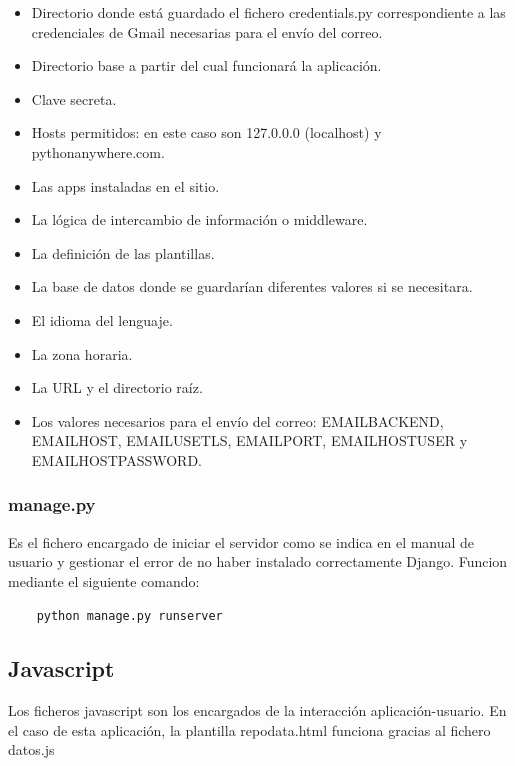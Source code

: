 \documentclass[a4paper, 12pt]{book}
\begin{document}
\begin{itemize}
	\item Directorio donde está guardado el fichero credentials.py correspondiente a las credenciales de Gmail necesarias para el envío del correo.
	\item Directorio base a partir del cual funcionará la aplicación.
	\item Clave secreta.
	\item Hosts permitidos: en este caso son 127.0.0.0 (localhost) y pythonanywhere.com.
	\item Las apps instaladas en el sitio.
	\item La lógica de intercambio de información o middleware\cite{website:middleware}.
	\item La definición de las plantillas.
	\item La base de datos donde se guardarían diferentes valores si se necesitara.
	\item El idioma del lenguaje.
	\item La zona horaria.
	\item La URL y el directorio raíz.
	\item Los valores necesarios para el envío del correo: EMAIL\textunderscore BACKEND, EMAIL\textunderscore HOST, EMAIL\textunderscore USE\textunderscore TLS, EMAIL\textunderscore PORT, EMAIL\textunderscore HOST\textunderscore USER y EMAIL\textunderscore HOST\textunderscore PASSWORD.
\end{itemize}

\subsubsection{manage.py}

Es el fichero encargado de iniciar el servidor como se indica en el manual de usuario y gestionar el error de no haber instalado correctamente Django. Funcion mediante el siguiente comando:

\begin{verbatim}
	python manage.py runserver
\end{verbatim}

\subsection{Javascript}

Los ficheros javascript son los encargados de la interacción aplicación-usuario. En el caso de esta aplicación, la plantilla repo\textunderscore data.html funciona gracias al fichero datos.js
\end{document}

